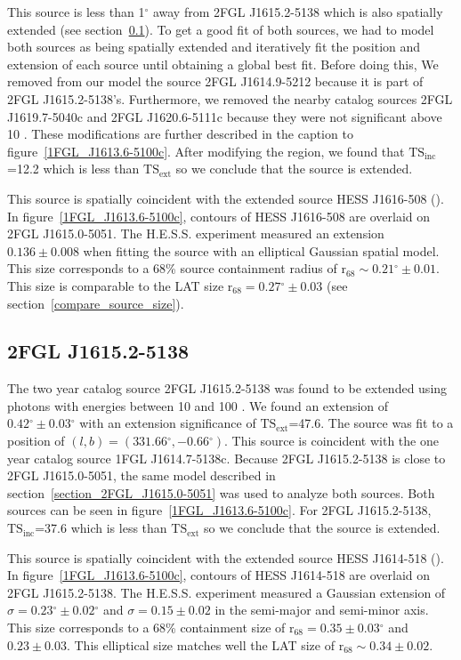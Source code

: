 \documentclass[12pt,preprint]{aastex}
\newcommand{\gev}{\text{GeV}\xspace}
\newcommand{\tev}{\text{TeV}\xspace}
\newcommand{\tsext}{{\ensuremath{\text{TS}_\text{ext}}}\xspace}
\newcommand{\tsinc}{\ensuremath{\text{TS}_\text{inc}}\xspace}
\newcommand{\rsixeight}{{\ensuremath{\text{r}_{68}}}\xspace}
\renewcommand{\deg}{\ensuremath{^\circ}\xspace}
\begin{document}
This source is less than 1\deg away from 2FGL J1615.2-5138 which is
also spatially extended (see section~\ref{section_2FGL_J1615.2-5138}).
To get a good fit of both sources, we had to model both sources as
being spatially extended and iteratively fit the position and extension
of each source until obtaining a global best fit.  Before doing this,
We removed from our model the source 2FGL J1614.9-5212 because it is
part of 2FGL J1615.2-5138's. Furthermore, we removed
the nearby catalog sources 2FGL J1619.7-5040c and 2FGL J1620.6-5111c
because they were not significant above 10 \gev.  These modifications
are further described in the caption to figure~\ref{1FGL_J1613.6-5100c}.
After modifying the region, we found that \tsinc=12.2 which is less than
\tsext so we conclude that the source is extended.

This source is spatially coincident with the extended \tev source HESS
J1616-508 (\cite{hess_plane_survey}).  In figure~\ref{1FGL_J1613.6-5100c},
contours of HESS J1616-508 are overlaid on 2FGL J1615.0-5051.
The H.E.S.S. experiment measured an extension $0.136\pm 0.008$
when fitting the source with an elliptical Gaussian spatial model.
This size corresponds to a 68\% source containment radius of
$\rsixeight\sim0.21\deg\pm0.01$. This size is comparable to the LAT size
$\rsixeight=0.27\deg\pm0.03$ (see section~\ref{compare_source_size}).


\subsection{2FGL J1615.2-5138}
\label{section_2FGL_J1615.2-5138}

The two year catalog source 2FGL J1615.2-5138 was found to be
extended using photons with energies between 10 \gev and 100 \gev.
We found an extension of $0.42\deg\pm0.03\deg$ with an extension
significance of \tsext=47.6.  The source was fit to a position
of $(l,b)=(331.66\deg,-0.66\deg)$.  This source is coincident
with the one year catalog source 1FGL J1614.7-5138c.  Because 2FGL
J1615.2-5138 is close to 2FGL J1615.0-5051, the same model described
in section~\ref{section_2FGL_J1615.0-5051} was used to analyze both
sources. Both sources can be seen in figure~\ref{1FGL_J1613.6-5100c}.
For 2FGL J1615.2-5138, \tsinc=37.6 which is less than \tsext so we
conclude that the source is extended.

This source is spatially coincident with the extended \tev source HESS
J1614-518 (\cite{hess_plane_survey}). In figure~\ref{1FGL_J1613.6-5100c},
contours of HESS J1614-518 are overlaid on 2FGL J1615.2-5138.
The H.E.S.S. experiment measured a Gaussian extension of
$\sigma=0.23\deg\pm0.02\deg$ and $\sigma=0.15\pm0.02$ in the semi-major
and semi-minor axis. This size corresponds to a 68\% containment size
of $\rsixeight=0.35\pm0.03\deg$ and $0.23\pm0.03$.  This elliptical size
matches well the LAT size of $\rsixeight\sim0.34\pm0.02$.
\end{document}
